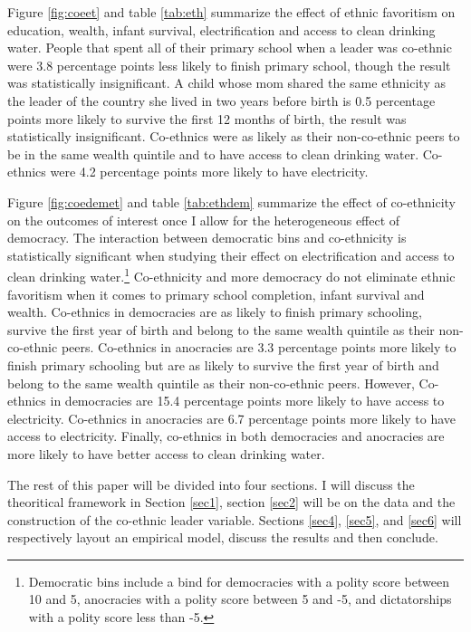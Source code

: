 \documentclass{wptemp}
\begin{document}
Figure \ref{fig:coeet} and table \ref{tab:eth} summarize the effect of ethnic favoritism on education, wealth, infant survival, electrification and access to clean drinking water. People that spent all of their primary school when a leader was co-ethnic were 3.8 percentage points less likely to finish primary school, though the result was statistically insignificant. A child whose mom shared the same ethnicity as the leader of the country she lived in two years before birth is 0.5 percentage points more likely to survive the first 12 months of birth, the result was statistically insignificant. Co-ethnics were as likely as their non-co-ethnic peers to be in the same wealth quintile and to have access to clean drinking water. Co-ethnics were 4.2 percentage points more likely to have electricity. 

Figure \ref{fig:coedemet} and table \ref{tab:ethdem} summarize the effect of co-ethnicity on the outcomes of interest once I allow for the heterogeneous effect of democracy. The interaction between democratic bins and co-ethnicity is statistically significant when studying their effect on electrification and access to clean drinking water.\footnote{Democratic bins include a bind for democracies with a polity score between 10 and 5, anocracies with a polity score between 5 and -5, and dictatorships with a polity score less than -5.} Co-ethnicity and more democracy do not eliminate ethnic favoritism when it comes to primary school completion, infant survival and wealth. Co-ethnics in democracies are as likely to finish primary schooling, survive the first year of birth and belong to the same wealth quintile as their non-co-ethnic peers. Co-ethnics in anocracies are 3.3 percentage points more likely to finish primary schooling but are as likely to survive the first year of birth and belong to the same wealth quintile as their non-co-ethnic peers.  However, Co-ethnics in democracies are 15.4 percentage points more likely to have access to electricity. Co-ethnics in anocracies are 6.7 percentage points more likely to have access to electricity. Finally, co-ethnics in both democracies and anocracies are more likely to have better access to clean drinking water.

The rest of this paper will be divided into four sections. I will discuss the theoritical framework in Section \ref{sec1}, section \ref{sec2} will be on the data and the construction of the co-ethnic leader variable. Sections \ref{sec4}, \ref{sec5}, and \ref{sec6} will respectively layout an empirical model, discuss the results and then conclude. 
\end{document}
